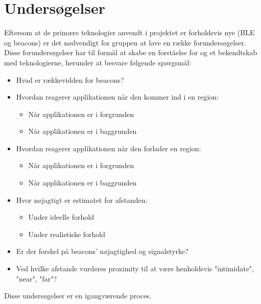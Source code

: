 \chapter{Undersøgelser}
Eftersom at de primære teknologier anvendt i projektet er forholdsvis nye (BLE og beacons) er det nødvendigt for gruppen at lave en række forundersøgelser. Disse forundersøgelser har til formål at skabe en forståelse for og et bekendtskab med teknologierne, herunder at besvare følgende spørgsmål:
\begin{itemize}
\item Hvad er rækkevidden for beacons?
\item Hvordan reagerer applikationen når den kommer ind i en region:
\begin{itemize}
\item Når applikationen er i forgrunden
\item Når applikationen er i baggrunden
\end{itemize}
\item Hvordan reagerer applikationen når den forlader en region:
\begin{itemize}
\item Når applikationen er i forgrunden
\item Når applikationen er i baggrunden
\end{itemize}
\item Hvor nøjagtigt er estimatet for afstanden:
\begin{itemize}
\item Under ideelle forhold
\item Under realistiske forhold
\end{itemize}
\item Er der forskel på beacons' nøjagtighed og signalstyrke?
\item Ved hvilke afstande vurderes proximity til at være henholdsvis "intimidate", "near", "far"?
\end{itemize}

Disse undersøgelser er en igangværende proces. 